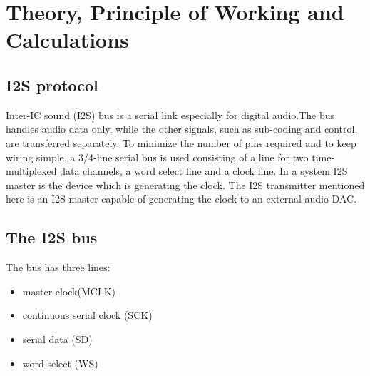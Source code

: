 \documentclass[12pt,a4paper]{report}
\newcommand{\comment}[1]{}
\begin{document}
\tableofcontents
\thispagestyle{logo}
\listoffigures
\thispagestyle{logo}
\listoftables
\thispagestyle{logo}

\pagestyle{logo}
\chapter{Theory, Principle of  Working and Calculations}
\thispagestyle{logo}
\section{I2S protocol}
 Inter-IC sound (I2S)
bus is  a serial link especially for digital audio.The bus handles audio data only, while the other signals, such
as sub-coding and control, are transferred separately. To minimize
the number of pins required and to keep wiring simple, a 3/4-line serial
bus is used consisting of a line for two time-multiplexed data
channels, a word select line and a clock line. In a system I2S master is the device which is generating the clock. The I2S transmitter mentioned here is an I2S master capable of generating the 
clock to an external audio DAC.


\comment {

\begin{figure}[ht]
\begin{tikztimingtable}[%
    timing/dslope=0.2,
    timing/.style={x=5ex,y=2ex},
    x=5ex,
    timing/rowdist=4ex,
    timing/name/.style={font=\sffamily\scriptsize}
]
\busref{SDA}       &    HLlhHlHhlhHl;[dotted]2D{};lllH \\
\busref{SCL}         &  HHLHLHLHLHLHH\\
\extracode
\begin{pgfonlayer}{background}
\begin{scope}[semitransparent ,semithick]
\vertlines[darkgray,dotted]{1,2 ,...,8.0}
\end{scope}
\end{pgfonlayer}
\end{tikztimingtable}
\caption{IIC data transfers}
\end{figure}

}
\section{The I2S bus}
 The bus has three lines:
\begin{itemize}

\item master clock(MCLK)
\item continuous serial clock (SCK)
\item serial data (SD)

\item word select (WS)


\end{itemize}
\end{document}
